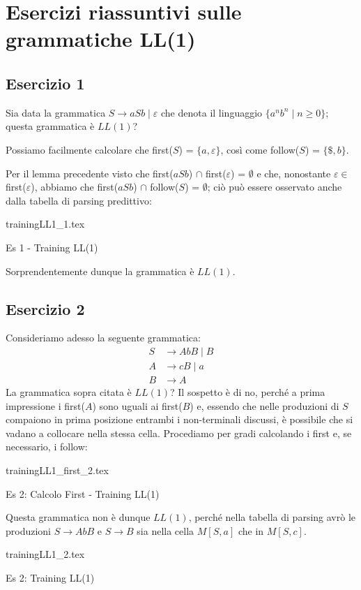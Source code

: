 \documentclass[class=book, crop=false, oneside, 12pt]{standalone}
\begin{document}
\section{Esercizi riassuntivi sulle grammatiche LL(1)}
\subsection*{Esercizio 1}
Sia data la grammatica \(S \rightarrow aSb \mid \varepsilon\) che denota il linguaggio \(\{a^n b^n \mid n \geq 0\}\); questa grammatica è \(LL(1)\)?

Possiamo facilmente calcolare che first(\(S\)) = \(\{a, \varepsilon\}\), così come follow(\(S\)) = \(\{\$, b\}\). 

Per il lemma precedente visto che first(\(aSb\)) \(\cap\) first(\(\varepsilon\)) = \(\emptyset\) e che, nonostante \(\varepsilon \in\) first(\(\varepsilon\)), abbiamo che first(\(aSb\)) \(\cap\) follow(\(S\)) = \(\emptyset\); ciò può essere osservato anche dalla tabella di parsing predittivo:
\begin{table}[H]
    \centering
    {trainingLL1_1.tex}
    \caption{Es 1 - Training LL(1)}
    \label{trainingLL1_1}
\end{table}
Sorprendentemente dunque la grammatica è \(LL(1)\).

\subsection*{Esercizio 2}
Consideriamo adesso la seguente grammatica:
\begin{align*}
    S &\rightarrow AbB \mid B \\
    A &\rightarrow cB \mid a \\
    B &\rightarrow A
\end{align*}
La grammatica sopra citata è \(LL(1)\)? Il sospetto è di no, perché a prima impressione i first(\(A\)) sono uguali ai first(\(B\)) e, essendo che nelle produzioni di \(S\) compaiono in prima posizione entrambi i non-terminali discussi, è possibile che si vadano a collocare nella stessa cella. Procediamo per gradi calcolando i first e, se necessario, i follow:
\begin{table}[H]
    \centering
    {trainingLL1_first_2.tex}
    \caption{Es 2: Calcolo First - Training LL(1)}
    \label{trainingLL1_first_2}
\end{table}
Questa grammatica non è dunque \(LL(1)\), perché nella tabella di parsing avrò le produzioni \(S \rightarrow AbB\) e \(S \rightarrow B\) sia nella cella \(M[S, a]\) che in \(M[S, c]\).
\begin{table}[H]
    \centering
    {trainingLL1_2.tex}
    \caption{Es 2: Training LL(1)}
    \label{trainingLL1_2}
\end{table}
\end{document}
